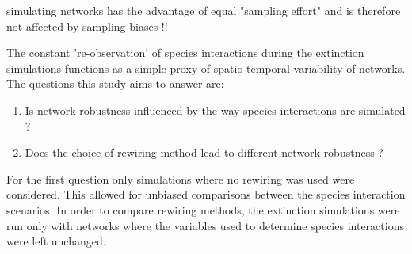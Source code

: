 \documentclass[12pt,a4paper]{article}
\begin{document}
	simulating networks has the advantage of equal "sampling effort" and is therefore not affected by sampling biases !!
	
The constant 're-observation' of species interactions during the extinction simulations functions as a simple proxy of spatio-temporal variability of networks. 
The questions this study aims to answer are:
\begin{enumerate}
\item Is network robustness influenced by the way species interactions are simulated ?
\item Does the choice of rewiring method lead to different network robustness ?
\end{enumerate}


For the first question only simulations where no rewiring was used were considered. This allowed for unbiased comparisons between the species interaction scenarios. In order to compare rewiring methods, the extinction simulations were run only with networks where the variables used to determine species interactions were left unchanged.



%	
\end{document}
